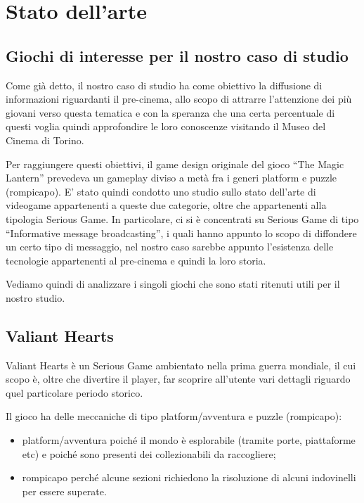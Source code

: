 \newpage


\section{Stato dell'arte}
\label{chap:stato_dell_arte}

\subsection{Giochi di interesse per il nostro caso di studio}

Come già detto, il nostro caso di studio ha come obiettivo la diffusione di informazioni riguardanti il pre-cinema, allo scopo di attrarre l'attenzione dei più giovani verso questa tematica e con la speranza che una certa percentuale di questi voglia quindi approfondire le loro conoscenze visitando il Museo del Cinema di Torino.

Per raggiungere questi obiettivi, il game design originale del gioco ``The Magic Lantern'' prevedeva un gameplay diviso a metà fra i generi platform e puzzle (rompicapo). E' stato quindi condotto uno studio sullo stato dell'arte di videogame appartenenti a queste due categorie, oltre che appartenenti alla tipologia Serious Game. In particolare, ci si è concentrati su Serious Game di tipo ``Informative message broadcasting'', i quali hanno appunto lo scopo di diffondere un certo tipo di messaggio, nel nostro caso sarebbe appunto l'esistenza delle tecnologie appartenenti al pre-cinema e quindi la loro storia.

Vediamo quindi di analizzare i singoli giochi che sono stati ritenuti utili per il nostro studio.


\subsection{Valiant Hearts}

Valiant Hearts è un Serious Game ambientato nella prima guerra mondiale, il cui scopo è, oltre che divertire il player, far scoprire all'utente vari dettagli riguardo quel particolare periodo storico.

Il gioco ha delle meccaniche di tipo platform/avventura e puzzle (rompicapo): 

\begin{itemize}
\item platform/avventura poiché il mondo è esplorabile (tramite porte, piattaforme etc) e poiché sono presenti dei collezionabili da raccogliere; 
\item rompicapo perché alcune sezioni richiedono la risoluzione di alcuni indovinelli per essere superate.
\end{itemize}

